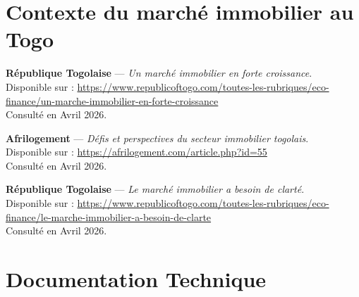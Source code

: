 \documentclass[12pt,a4paper]{report}
\begin{document}
\vspace{0.5cm}

\section*{Contexte du marché immobilier au Togo}

\begin{enumerate}[leftmargin=*, label={\textcolor{cuivre}{\textbf{[\arabic*]}}}]

    \item \textbf{République Togolaise} — \textit{Un marché immobilier en forte croissance}.\\
    Disponible sur : \url{https://www.republicoftogo.com/toutes-les-rubriques/eco-finance/un-marche-immobilier-en-forte-croissance}\\
    \textcolor{grisfonce}{Consulté en Avril 2026.}

    \vspace{0.3cm}

    \item \textbf{Afrilogement} — \textit{Défis et perspectives du secteur immobilier togolais}.\\
    Disponible sur : \url{https://afrilogement.com/article.php?id=55}\\
    \textcolor{grisfonce}{Consulté en Avril 2026.}

    \vspace{0.3cm}

    \item \textbf{République Togolaise} — \textit{Le marché immobilier a besoin de clarté}.\\
    Disponible sur : \url{https://www.republicoftogo.com/toutes-les-rubriques/eco-finance/le-marche-immobilier-a-besoin-de-clarte}\\
    \textcolor{grisfonce}{Consulté en Avril 2026.}

\end{enumerate}

\vspace{0.5cm}
\section*{Documentation Technique}
\end{document}
